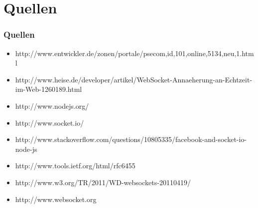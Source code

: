 \documentclass{beamer}
\begin{document}
\section{Quellen}
\begin{frame}
\frametitle{Quellen}
\begin{itemize}
\item http://www.entwickler.de/zonen/portale/psecom,id,101,online,5134,neu,1.html
\item http://www.heise.de/developer/artikel/WebSocket-Annaeherung-an-Echtzeit-im-Web-1260189.html
\item http://www.nodejs.org/
\item http://www.socket.io/
\item http://www.stackoverflow.com/questions/10805335/facebook-and-socket-io-node-js
\item http://www.tools.ietf.org/html/rfc6455
\item http://www.w3.org/TR/2011/WD-websockets-20110419/
\item http://www.websocket.org
\end{itemize}
\end{frame}
\end{document}
